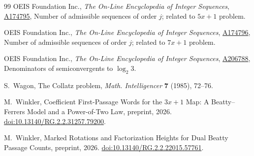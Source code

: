 \documentclass[11pt]{article}
\begin{document}
\begin{thebibliography}{99}
OEIS Foundation Inc.,
\newblock \emph{The On-Line Encyclopedia of Integer Sequences},
\newblock \href{https://oeis.org/A174795}{A174795},
Number of admissible sequences of order \(j\); related to \(5x+1\)
problem.

OEIS Foundation Inc.,
\newblock \emph{The On-Line Encyclopedia of Integer Sequences},
\newblock \href{https://oeis.org/A174796}{A174796},
Number of admissible sequences of order \(j\); related to \(7x+1\)
problem.

OEIS Foundation Inc.,
\newblock \emph{The On-Line Encyclopedia of Integer Sequences},
\newblock \href{https://oeis.org/A206788}{A206788},
Denominators of semiconvergents to \(\log_2 3\).

S.~Wagon,
\newblock The Collatz problem,
\newblock \emph{Math. Intelligencer} \textbf{7} (1985), 72--76.

M.~Winkler,
\newblock Coefficient First-Passage Words for the \(3x+1\) Map:
A Beatty--Ferrers Model and a Power-of-Two Law,
\newblock preprint, 2026.
\newblock \href{https://doi.org/10.13140/RG.2.2.31257.79200}{doi:10.13140/RG.2.2.31257.79200}.

M.~Winkler,
\newblock Marked Rotations and Factorization Heights for Dual Beatty
Passage Counts,
\newblock preprint, 2026.
\newblock \href{https://doi.org/10.13140/RG.2.2.22015.57761}{doi:10.13140/RG.2.2.22015.57761}.

\end{thebibliography}
\end{document}
